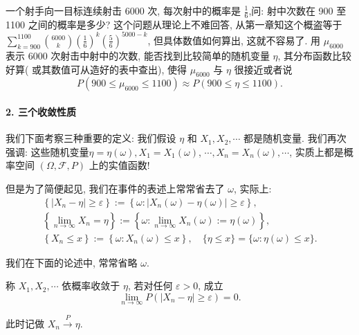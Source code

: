 \begin{example}
    一个射手向一目标连续射击 6000 次, 每次射中的概率是 $\frac{1}{6}$,问: 射中次数在 900 至 1100 之间的概率是多少? 这个问题从理论上不难回答, 从第一章知这个概盗等于 $\sum_{k=900}^{1100} {6000\choose k}\left(\frac{1}{6}\right)^k\left(\frac{5}{6}\right)^{5000-k}$, 但具体数值如何算出, 这就不容易了. 用 $\mu_{6000}$ 表示 6000 次射击中射中的次数, 能否找到比较简单的随机变量 $\eta$, 其分布函数比较好算( 或其数值可从造好的表中查出), 使得 $\mu_{6000}$ 与 $\eta$ 很接近或者说
$$
P\left(900 \leqslant \mu_{6000} \leqslant 1100\right) \approx P(900 \leqslant \eta \leqslant 1100) .
$$
\end{example}

\paragraph{2. 三个收敛性质} 我们下面考察三种重要的定义: 我们假设 $\eta$ 和 $X_1, X_2, \cdots$ 都是随机变量. 我们再次强调: 这些随机变量$\eta=\eta(\omega), X_1=X_1(\omega)$, $\cdots, X_n=X_n(\omega), \cdots$, 实质上都是概率空间 $(\Omega, \mathscr{F}, P)$ 上的实值函数!

但是为了简便起见, 我们在事件的表述上常常省去了 $\omega$, 实际上:
$$
\begin{gathered}
\left\{\left|X_n-\eta\right| \geqslant \varepsilon\right\}:=\left\{\omega:\left|X_n(\omega)-\eta(\omega)\right| \geqslant \varepsilon\right\}, \\
\left\{\lim _{n \rightarrow \infty} X_n=\eta\right\}:=\left\{\omega: \lim _{n \rightarrow \infty} X_n(\omega):=\eta(\omega)\right\}, \\
\left\{X_n \leqslant x\right\}:=\left\{\omega: X_n(\omega) \leqslant x\right\}, \quad\{\eta \leqslant x\}=\{\omega: \eta(\omega) \leqslant x\} .
\end{gathered}
$$

我们在下面的论述中, 常常省略 $\omega$.

\begin{center}
\end{center}

\begin{definition}
    称 $X_1, X_2, \cdots$ 依概率收敛于 $\eta$, 若对任何 $\varepsilon>0$, 成立
$$
\lim _{n \rightarrow \infty} P\left(\left|X_n-\eta\right| \geqslant \varepsilon\right)=0 .
$$

此时记做 $X_n \stackrel{P}{\longrightarrow} \eta$.
\end{definition}


